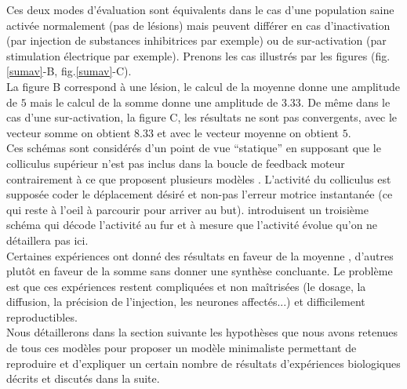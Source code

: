 Ces deux modes d'évaluation sont équivalents dans le cas d'une population saine activée normalement (pas de lésions) mais peuvent différer en cas d'inactivation (par injection de substances inhibitrices par exemple) ou de sur-activation (par stimulation électrique par exemple). Prenons les cas illustrés par les figures (fig.\ref{sumav}-B, fig.\ref{sumav}-C).\\

La figure B correspond à une lésion, le calcul de la moyenne donne une amplitude de $5$ mais le calcul de la somme donne une amplitude de $3.33$. De même dans le cas d'une sur-activation, la figure C, les résultats ne sont pas convergents, avec le vecteur somme on obtient $8.33$ et avec le vecteur moyenne on obtient $5$.\\

Ces schémas sont considérés d'un point de vue ``statique'' en supposant que le colliculus supérieur n'est pas inclus dans la boucle de feedback moteur contrairement à ce que proposent plusieurs modèles \cite{Robinson:1972}. L'activité du colliculus est supposée coder le déplacement désiré et non-pas l'erreur motrice instantanée (ce qui reste à l'oeil à parcourir pour arriver au but). \cite{Gandhi:2011} introduisent un troisième schéma qui décode l'activité au fur et à mesure que l'activité évolue qu'on ne détaillera pas ici.\\

Certaines expériences ont donné des résultats en faveur de la moyenne \cite{Lee:1988}, d'autres plutôt en faveur de la somme sans donner une synthèse concluante. Le problème est que ces expériences restent compliquées et non maîtrisées (le dosage, la diffusion, la précision de l'injection, les neurones affectés...) et difficilement reproductibles.\\

Nous détaillerons dans la section suivante les hypothèses que nous avons retenues de tous ces modèles pour proposer un modèle minimaliste permettant de reproduire et d'expliquer un certain nombre de résultats d'expériences biologiques décrits et discutés dans la suite.\\


